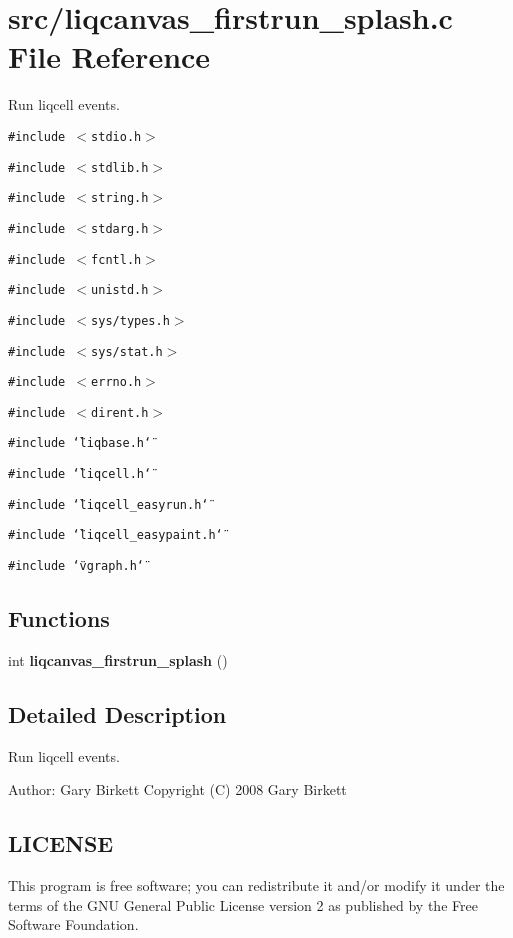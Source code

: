 \section{src/liqcanvas\_\-firstrun\_\-splash.c File Reference}
\label{d3/dcb/liqcanvas__firstrun__splash_8c}
Run liqcell events.  


{\tt \#include $<$stdio.h$>$}\par
{\tt \#include $<$stdlib.h$>$}\par
{\tt \#include $<$string.h$>$}\par
{\tt \#include $<$stdarg.h$>$}\par
{\tt \#include $<$fcntl.h$>$}\par
{\tt \#include $<$unistd.h$>$}\par
{\tt \#include $<$sys/types.h$>$}\par
{\tt \#include $<$sys/stat.h$>$}\par
{\tt \#include $<$errno.h$>$}\par
{\tt \#include $<$dirent.h$>$}\par
{\tt \#include \char`\"{}liqbase.h\char`\"{}}\par
{\tt \#include \char`\"{}liqcell.h\char`\"{}}\par
{\tt \#include \char`\"{}liqcell\_\-easyrun.h\char`\"{}}\par
{\tt \#include \char`\"{}liqcell\_\-easypaint.h\char`\"{}}\par
{\tt \#include \char`\"{}vgraph.h\char`\"{}}\par
\subsection*{Functions}
\begin{CompactItemize}
\item 
int {\bf liqcanvas\_\-firstrun\_\-splash} ()
\end{CompactItemize}


\label{_details}
\subsection{Detailed Description}
Run liqcell events. 

\begin{Desc}
\item[Author:]Gary Birkett Copyright (C) 2008 Gary Birkett\end{Desc}
\subsection{LICENSE}\label{d7/db4/liqcell__prop_8c_LICENSE}
This program is free software; you can redistribute it and/or modify it under the terms of the GNU General Public License version 2 as published by the Free Software Foundation.

